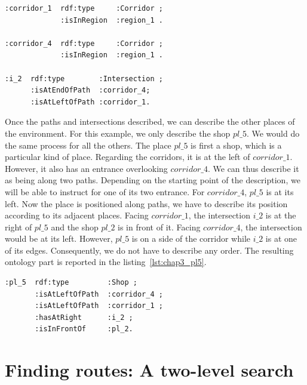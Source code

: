 \begin{lstlisting}[frame=single, basicstyle=\scriptsize\ttfamily, label={lst:chap3_corridors}, caption={Description of the two corridor and their common intersection in the OWL language using the Turle syntax.},captionpos=b, style=OwlTurtle_indiv]
:corridor_1  rdf:type     :Corridor ;
             :isInRegion  :region_1 .
             
:corridor_4  rdf:type     :Corridor ;
             :isInRegion  :region_1 .
             
:i_2  rdf:type        :Intersection ;
      :isAtEndOfPath  :corridor_4;
      :isAtLeftOfPath :corridor_1.
\end{lstlisting}

Once the paths and intersections described, we can describe the other places of the environment. For this example, we only describe the shop $pl\_5$. We would do the same process for all the others. The place $pl\_5$ is first a shop,  which is a particular kind of place. Regarding the corridors, it is at the left of $corridor\_1$. However, it also has an entrance overlooking $corridor\_4$. We can thus describe it as being along two paths. Depending on the starting point of the description, we will be able to instruct for one of its two entrance. For $corridor\_4$, $pl\_5$ is at its left. Now the place is positioned along paths, we have to describe its position according to its adjacent places. Facing $corridor\_1$, the intersection $i\_2$ is at the right of $pl\_5$ and the shop $pl\_2$ is in front of it. Facing $corridor\_4$, the intersection would be at its left. However, $pl\_5$ is on a side of the corridor while $i\_2$ is at one of its edges. Consequently, we do not have to describe any order. The resulting ontology part is reported in the listing~\ref{lst:chap3_pl5}.

\begin{lstlisting}[frame=single, basicstyle=\scriptsize\ttfamily, label={lst:chap3_pl5}, caption={Description of the shop pl\_5 using the \acrshort{ssr} in the OWL language using the Turle syntax.},captionpos=b, style=OwlTurtle_indiv]
:pl_5  rdf:type         :Shop ;
       :isAtLeftOfPath  :corridor_4 ;
       :isAtLeftOfPath  :corridor_1 ;
       :hasAtRight      :i_2 ;
       :isInFrontOf     :pl_2.
\end{lstlisting}

\section{Finding routes: A two-level search}

